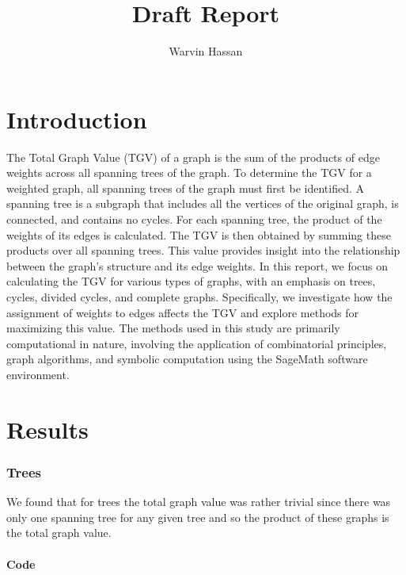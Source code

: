 \documentclass[12pt,letterpaper]{article}
\title{Draft Report}
\author{Warvin Hassan}
\begin{document}
\maketitle
\pagebreak
\tableofcontents
\pagebreak
\part{Introduction}
The Total Graph Value (TGV) of a graph is the sum of the products of edge weights across all spanning trees of the graph. To determine the TGV for a weighted graph, all spanning trees of the graph must first be identified. A spanning tree is a subgraph that includes all the vertices of the original graph, is connected, and contains no cycles. For each spanning tree, the product of the weights of its edges is calculated. The TGV is then obtained by summing these products over all spanning trees. This value provides insight into the relationship between the graph's structure and its edge weights. In this report, we focus on calculating the TGV for various types of graphs, with an emphasis on trees, cycles, divided cycles, and complete graphs. Specifically, we investigate how the assignment of weights to edges affects the TGV and explore methods for maximizing this value. The methods used in this study are primarily computational in nature, involving the application of combinatorial principles, graph algorithms, and symbolic computation using the SageMath software environment.\\

\pagebreak
\part{Results}

\section{Trees}  \label{P}

We found that for trees the total graph value was rather trivial since there was only one spanning tree for any given tree and so the product of these graphs is the total graph value.

\subsection{Code}
\end{document}
